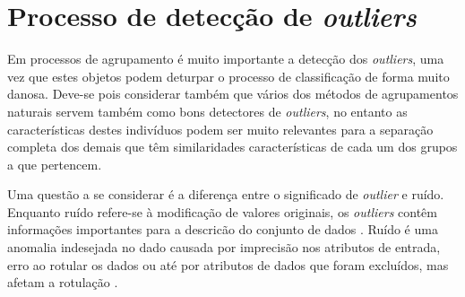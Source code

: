 \begin{figure}[!ht]
	\centering
\end{figure}

\section{Processo de detecção de \textit{outliers}}

Em processos de agrupamento é muito importante a detecção dos \textit{outliers}, uma vez que estes objetos podem deturpar o processo de classificação de forma muito danosa. Deve-se pois considerar também que vários dos métodos de agrupamentos naturais servem também como bons detectores de \textit{outliers}, no entanto as características destes indivíduos podem ser muito relevantes para a separação completa dos demais que têm similaridades características de cada um dos grupos a que pertencem.

Uma questão a se considerar é a diferença entre o significado de \textit{outlier} e ruído. Enquanto ruído refere-se à modificação de valores originais, os \textit{outliers} contêm informações importantes para a descricão do conjunto de dados \cite{chandola2009}. Ruído é uma anomalia indesejada no dado causada por imprecisão nos atributos de entrada, erro ao rotular os dados ou até por atributos de dados que foram excluídos, mas afetam a rotulação \cite{alpaydin2010}.

